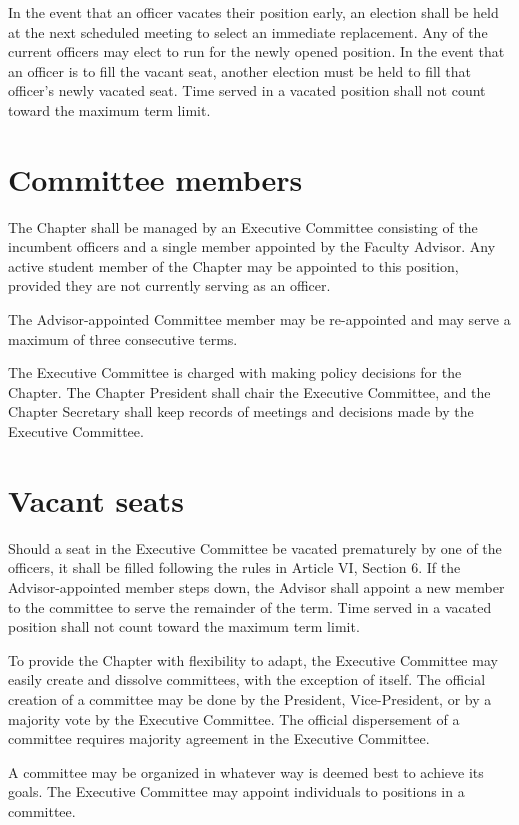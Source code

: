 \documentclass{ronr-bylaws}
\begin{document}
In the event that an officer vacates their position early, an election shall be held at the next
scheduled meeting to select an immediate replacement. Any of the current officers may elect to
run for the newly opened position. In the event that an officer is to fill the vacant seat, another
election must be held to fill that officer’s newly vacated seat. Time served in a vacated position
shall not count toward the maximum term limit.

\section{Committee members}
The Chapter shall be managed by an Executive Committee consisting of the incumbent
officers and a single member appointed by the Faculty Advisor. Any active student member of the
Chapter may be appointed to this position, provided they are not currently serving as an officer.

The Advisor-appointed Committee member  may be re-appointed and may serve a maximum  of
three consecutive terms.

The Executive Committee is charged with making policy decisions for the Chapter. The Chapter
President shall chair the Executive Committee, and the Chapter Secretary shall keep records of
meetings and decisions made by the Executive Committee.

\section{Vacant seats}
Should a seat in the Executive Committee be vacated prematurely by one of the officers,
it shall be filled following the rules in Article VI, Section 6. If the Advisor-appointed member steps down, the Advisor shall appoint a new member to the committee to serve the remainder of the term. Time served in a vacated position shall not count toward the maximum term limit.

To provide the Chapter with flexibility to adapt, the Executive Committee may easily
create and dissolve committees, with the exception of itself. The official creation of a committee
may be done by the President, Vice-President, or by a majority vote by the Executive Committee.
The official dispersement of a committee requires majority agreement in the Executive Committee.

A committee may be organized in whatever way is deemed best to achieve its goals. The Executive
Committee may  appoint individuals to positions in a committee.
\end{document}
